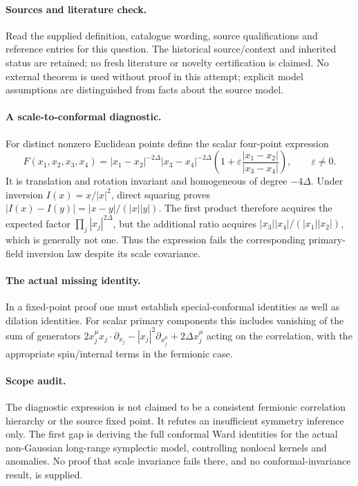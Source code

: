 \documentclass[11pt]{article}
\begin{document}
\paragraph{Sources and literature check.}
Read the supplied definition, catalogue wording, source qualifications and reference entries for this question. The historical source/context and inherited status are retained; no fresh literature or novelty certification is claimed. No external theorem is used without proof in this attempt; explicit model assumptions are distinguished from facts about the source model.

\paragraph{A scale-to-conformal diagnostic.} For distinct nonzero Euclidean points define the scalar four-point expression
\[
 F(x_1,x_2,x_3,x_4)=|x_1-x_2|^{-2\Delta}|x_3-x_4|^{-2\Delta}
 \left(1+\varepsilon\frac{|x_1-x_2|}{|x_3-x_4|}\right),\qquad\varepsilon\ne0.
\]
It is translation and rotation invariant and homogeneous of degree \(-4\Delta\). Under inversion \(I(x)=x/|x|^2\), direct squaring proves \(|I(x)-I(y)|=|x-y|/(|x||y|)\). The first product therefore acquires the expected factor \(\prod_j|x_j|^{2\Delta}\), but the additional ratio acquires \(|x_3||x_4|/(|x_1||x_2|)\), which is generally not one. Thus the expression fails the corresponding primary-field inversion law despite its scale covariance.
\paragraph{The actual missing identity.} In a fixed-point proof one must establish special-conformal identities as well as dilation identities. For scalar primary components this includes vanishing of the sum of generators \(2x_j^\mu x_j\cdot\partial_{x_j}-|x_j|^2\partial_{x_j^\mu}+2\Delta x_j^\mu\) acting on the correlation, with the appropriate spin/internal terms in the fermionic case.
\paragraph{Scope audit.} The diagnostic expression is not claimed to be a consistent fermionic correlation hierarchy or the source fixed point. It refutes an insufficient symmetry inference only. The first gap is deriving the full conformal Ward identities for the actual non-Gaussian long-range symplectic model, controlling nonlocal kernels and anomalies. No proof that scale invariance fails there, and no conformal-invariance result, is supplied.
\end{document}
